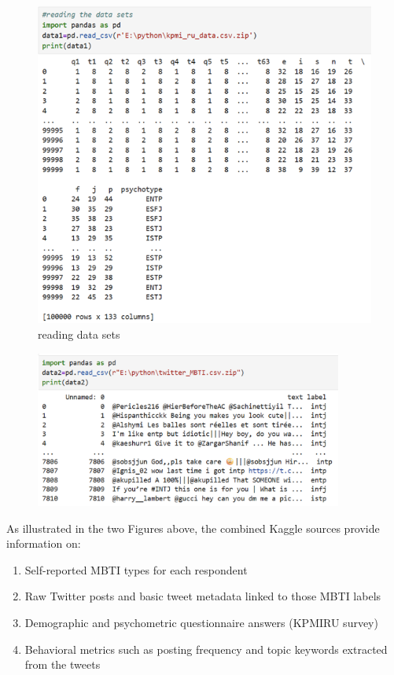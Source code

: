 \documentclass[12pt]{article}
\begin{document}
	\begin{figure}[H]
		\centering
		\includegraphics{Q1P1} %
		\caption{reading data sets}
	
	\end{figure}
	\begin{figure}[H]
		\centering
		\includegraphics[width=0.9\textwidth]{Q1P2}
		
	\end{figure}
	As illustrated in the two Figures above, the combined Kaggle sources provide information on:
	\begin{enumerate}
		\item Self-reported MBTI types for each respondent
		\item Raw Twitter posts and basic tweet metadata linked to those MBTI labels  
		\item Demographic and psychometric questionnaire answers (KPMIRU survey) 
		\item Behavioral metrics such as posting frequency and topic keywords extracted from the tweets
	\end{enumerate}
\end{document}
